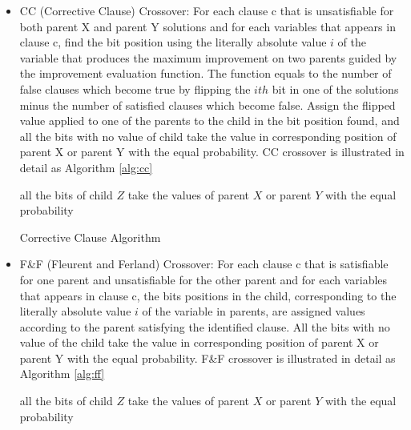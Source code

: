 \begin{itemize}
	\item
	      CC (Corrective Clause) Crossover: For each clause c that is unsatisfiable for
	      both parent X and parent Y solutions and for each variables that appears in
	      clause c, find the bit position using the literally absolute value
	      $i$ of the variable that produces the maximum improvement on
	      two parents guided by the improvement evaluation function. The function equals
	      to the number of false clauses which become true by flipping the
	      $ith$ bit in one of the solutions minus the number of
	      satisfied clauses which become false. Assign the flipped value applied to one
	      of the parents to the child in the bit position found, and all the bits with
	      no value of child take the value in corresponding position of parent X or
	      parent Y with the equal probability. CC crossover is illustrated in detail as Algorithm \ref{alg:cc}
		\begin{algorithm}
		\SetAlgoLined
		\label{alg:cc} 
			all the bits of child $Z$ take the values of parent $X$ or parent $Y$ with the equal probability\;
		\caption{Corrective Clause Algorithm}
		\end{algorithm}
	\item
	      F\&F (Fleurent and Ferland) Crossover: For each clause c that is satisfiable
	      for one parent and unsatisfiable for the other parent and for each variables
	      that appears in clause c, the bits positions in the child, corresponding to
	      the literally absolute value $i$ of the variable in parents,
	      are assigned values according to the parent satisfying the identified clause.
	      All the bits with no value of the child take the value in corresponding
	      position of parent X or parent Y with the equal probability. F\&F crossover is illustrated in detail as Algorithm \ref{alg:ff}
		  \begin{algorithm}
			\SetAlgoLined
			\label{alg:ff} 
			\KwData{two parents $X$ and $Y$}
			\KwResult{one child $Z$}
			  all the bits of child $Z$ take the values of parent $X$ or parent $Y$ with the equal probability\;
\end{algorithm}
\end{itemize}
